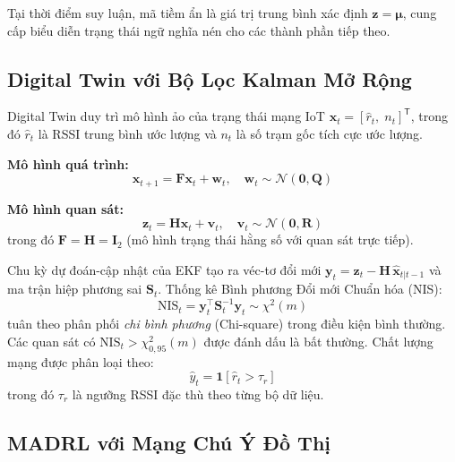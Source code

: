 \documentclass[conference]{IEEEtran}
\begin{document}
Tại thời điểm suy luận, mã tiềm ẩn là giá trị trung bình xác
định $\mathbf{z} = \boldsymbol{\mu}$, cung cấp biểu diễn trạng
thái ngữ nghĩa nén cho các thành phần tiếp theo.

\subsection{Digital Twin với Bộ Lọc Kalman Mở Rộng}
\label{subsec:dt}

Digital Twin duy trì mô hình ảo của trạng thái mạng IoT
$\mathbf{x}_t = [\hat{r}_t,\; n_t]^{\mathsf{T}}$, trong đó $\hat{r}_t$
là RSSI trung bình ước lượng và $n_t$ là số trạm gốc tích cực
ước lượng.

\textbf{Mô hình quá trình:}
\begin{equation}
  \mathbf{x}_{t+1} = \mathbf{F}\mathbf{x}_t + \mathbf{w}_t,\quad
  \mathbf{w}_t \sim \mathcal{N}(\mathbf{0}, \mathbf{Q})
  \label{eq:ekf_process}
\end{equation}

\textbf{Mô hình quan sát:}
\begin{equation}
  \mathbf{z}_t = \mathbf{H}\mathbf{x}_t + \mathbf{v}_t,\quad
  \mathbf{v}_t \sim \mathcal{N}(\mathbf{0}, \mathbf{R})
  \label{eq:ekf_obs}
\end{equation}
trong đó $\mathbf{F} = \mathbf{H} = \mathbf{I}_2$ (mô hình trạng
thái hằng số với quan sát trực tiếp).

Chu kỳ dự đoán-cập nhật của EKF tạo ra véc-tơ đổi mới
$\mathbf{y}_t = \mathbf{z}_t - \mathbf{H}\,\hat{\mathbf{x}}_{t|t-1}$
và ma trận hiệp phương sai $\mathbf{S}_t$. Thống kê Bình phương
Đổi mới Chuẩn hóa (NIS):
\begin{equation}
  \text{NIS}_t = \mathbf{y}_t^\top \mathbf{S}_t^{-1} \mathbf{y}_t
  \sim \chi^2(m)
  \label{eq:nis}
\end{equation}
tuân theo phân phối \textit{chi bình phương} (Chi-square) trong điều kiện bình thường.
Các quan sát có $\text{NIS}_t > \chi^2_{0{,}95}(m)$ được đánh dấu
là bất thường. Chất lượng mạng được phân loại theo:
\begin{equation}
  \hat{y}_t = \mathbf{1}[\hat{r}_t > \tau_r]
  \label{eq:quality}
\end{equation}
trong đó $\tau_r$ là ngưỡng RSSI đặc thù theo từng bộ dữ liệu.

\subsection{MADRL với Mạng Chú Ý Đồ Thị}
\label{subsec:madrl}
\end{document}
